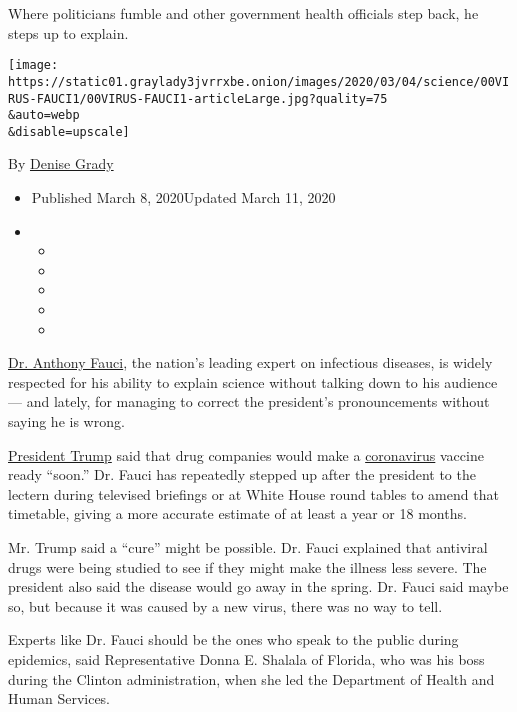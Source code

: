 Where politicians fumble and other government health officials step
back, he steps up to explain.

\texttt{[image: https://static01.graylady3jvrrxbe.onion/images/2020/03/04/science/00VIRUS-FAUCI1/00VIRUS-FAUCI1-articleLarge.jpg?quality=75\\\&auto=webp\\\&disable=upscale]}

By \href{https://www.nytimes3xbfgragh.onion/by/denise-grady}{Denise
Grady}

\begin{itemize}
\item
  Published March 8, 2020Updated March 11, 2020
\item
  \begin{itemize}
  \item
  \item
  \item
  \item
  \item
  \end{itemize}
\end{itemize}

\href{https://www.nytimes3xbfgragh.onion/2020/03/11/us/politics/anthony-fauci-coronavirus.html}{Dr.
Anthony Fauci}, the nation's leading expert on infectious diseases, is
widely respected for his ability to explain science without talking down
to his audience --- and lately, for managing to correct the president's
pronouncements without saying he is wrong.

\href{https://www.nytimes3xbfgragh.onion/2020/03/11/us/politics/anthony-fauci-coronavirus.html}{President
Trump} said that drug companies would make a
\href{https://www.nytimes3xbfgragh.onion/2020/03/11/us/politics/anthony-fauci-coronavirus.html}{coronavirus}
vaccine ready ``soon.'' Dr. Fauci has repeatedly stepped up after the
president to the lectern during televised briefings or at White House
round tables to amend that timetable, giving a more accurate estimate of
at least a year or 18 months.

Mr. Trump said a ``cure'' might be possible. Dr. Fauci explained that
antiviral drugs were being studied to see if they might make the illness
less severe. The president also said the disease would go away in the
spring. Dr. Fauci said maybe so, but because it was caused by a new
virus, there was no way to tell.

Experts like Dr. Fauci should be the ones who speak to the public during
epidemics, said Representative Donna E. Shalala of Florida, who was his
boss during the Clinton administration, when she led the Department of
Health and Human Services.

